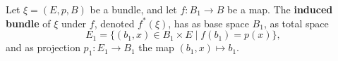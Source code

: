 Let $\xi = (E, p, B)$ be a bundle, and let $f: B_1 \to B$ be a map. The \textbf{induced bundle} of $\xi$ under $f$, denoted $f^*(\xi)$, has as base space $B_1$, as total space
$$E_1 = \{(b_1, x) \in B_1 \times E \mid f(b_1) = p(x)\},$$
and as projection $p_1: E_1 \to B_1$ the map $(b_1, x) \mapsto b_1$.
